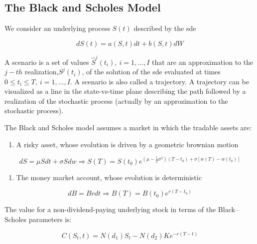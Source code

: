 \documentclass[11pt]{article}
\providecommand{\tightlist}{%
      \setlength{\itemsep}{0pt}\setlength{\parskip}{0pt}}
\begin{document}
    \hypertarget{the-black-and-scholes-model}{%
\subsection{The Black and Scholes
Model}\label{the-black-and-scholes-model}}

    We consider an underlying process \(S(t)\) described by the sde

\begin{equation}
dS(t) = a(S,t) dt + b(S,t)dW
\end{equation}

A scenario is a set of values \(\hat S^j (t_i), \> i=1,\dots,I\) that
are an approximation to the \(j-th\) realization,\(S^j (t_i)\), of the
solution of the sde evaluated at times
\(0 \le t_i \le T, \> i=1,\dots,I\). A scenario is also called a
trajectory. A trajectory can be visualized as a line in the
state-vs-time plane describing the path followed by a realization of the
stochastic process (actually by an approzimation to the stochastic
process).

The Black and Scholes model assumes a market in which the tradable
assets are:

\begin{enumerate}
\def\labelenumi{\arabic{enumi}.}
\tightlist
\item
  A risky asset, whose evolution is driven by a geometric brownian
  motion
\end{enumerate}

\begin{equation}
dS = \mu S dt + \sigma S dw \Rightarrow S(T)=S(t_0) e^{(\mu-\frac{1}{2} \sigma^2) (T-t_0) + \sigma[w(T) - w(t_0)]}
\end{equation}

\begin{enumerate}
\def\labelenumi{\arabic{enumi}.}
\setcounter{enumi}{1}
\tightlist
\item
  The money market account, whose evolution is deterministic
\end{enumerate}

\begin{equation}
dB=Brdt \Rightarrow B(T) = B(t_0) e^{r(T-t_0)}
\end{equation}

The value for a non-dividend-paying underlying stock in terms of the
Black--Scholes parameters is:

\begin{equation}\label{eq:1}
C(S_{t},t)  =N(d_{1})S_{t}-N(d_{2})Ke^{-r(T-t)} 
\end{equation}
\end{document}
